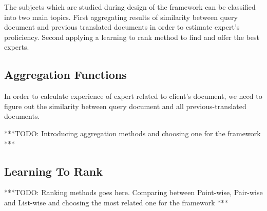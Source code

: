 The subjects which are studied during design of the framework can be classified into two main topics. First aggregating results of similarity between query document and previous translated documents in order to estimate expert's proficiency. Second applying a learning to rank method to find and offer the best experts.

\subsection{Aggregation Functions}
In order to calculate experience of expert related to client's document, we need to figure out the similarity between query document and all previous-translated documents. 

***TODO: Introducing aggregation methods and choosing one for the framework ***


\subsection{Learning To Rank}
***TODO: Ranking methods goes here. Comparing between Point-wise, Pair-wise and List-wise and choosing the most related one for the framework ***